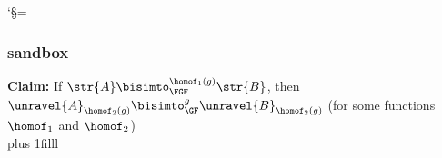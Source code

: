 \documentclass[aspectratio=169]{beamer}
\begin{document}
\catcode`§=\active

\begin{frame}\frametitle{sandbox}
  \textbf{Claim:} If $\str{A} \bisimto_{\FGF}^{\homof_{1}(g)} \str{B}$, then $\unravel{A}_{\homof_{2}(g)} \bisimto_{\GF}^{g} \unravel{B}_{\homof_{2}(g)}$ (for some functions $\homof_{1}$ and $\homof_{2}$)\\[2em]
  
  \vskip 0pt plus 1filll
\end{frame}
\end{document}
